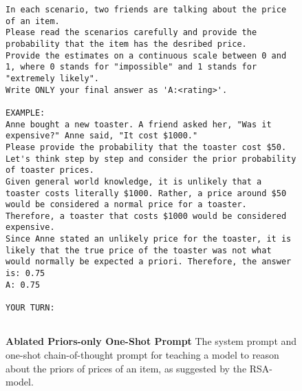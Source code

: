 \begin{figure}[htpb]
\centering
\begin{tcolorbox}[
width=1\linewidth,
title={Ablated Priors-only One-Shot Prompt}]
\fontsize{5pt}{5pt}\selectfont
\ttfamily
\begin{lstlisting}[language={}]
In each scenario, two friends are talking about the price of an item.
Please read the scenarios carefully and provide the probability that the item has the desribed price.
Provide the estimates on a continuous scale between 0 and 1, where 0 stands for "impossible" and 1 stands for "extremely likely".
Write ONLY your final answer as 'A:<rating>'.

EXAMPLE:
Anne bought a new toaster. A friend asked her, "Was it expensive?" Anne said, "It cost $1000."
Please provide the probability that the toaster cost $50.
Let's think step by step and consider the prior probability of toaster prices.
Given general world knowledge, it is unlikely that a toaster costs literally $1000. Rather, a price around $50 would be considered a normal price for a toaster. Therefore, a toaster that costs $1000 would be considered expensive. 
Since Anne stated an unlikely price for the toaster, it is likely that the true price of the toaster was not what would normally be expected a priori. Therefore, the answer is: 0.75
A: 0.75

YOUR TURN:


\end{lstlisting}
\end{tcolorbox}
\caption{\textbf{Ablated Priors-only One-Shot Prompt}
The system prompt and one-shot chain-of-thought prompt for teaching a model to reason about the priors of prices of an item, as suggested by the RSA-model.}
\label{prompt:rsa-priors}
\end{figure}